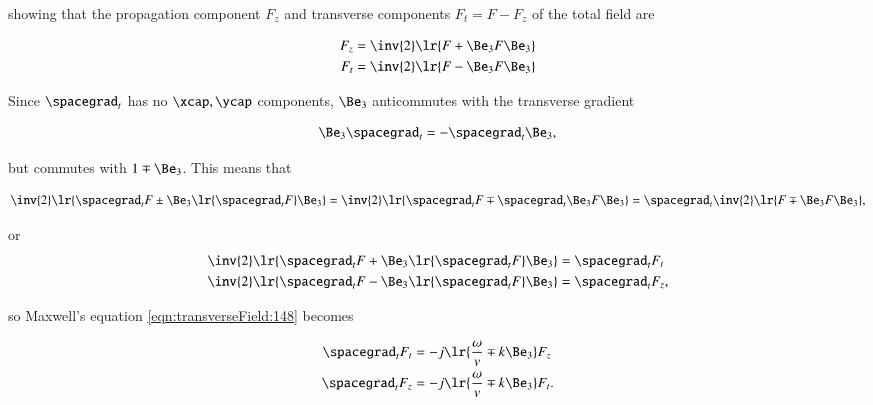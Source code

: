 showing that the propagation component \( F_z \) and transverse components \( F_t = F - F_z \) of the total field are

\begin{dmath}\label{eqn:transverseField:128}
\begin{aligned}
F_z &= \inv{2} \lr{ F + \Be_3 F \Be_3 } \\
F_t &= \inv{2} \lr{ F - \Be_3 F \Be_3 } \\
\end{aligned}
\end{dmath}

Since \( \spacegrad_t \) has no \( \xcap, \ycap \) components, \( \Be_3 \) anticommutes with the transverse gradient

\begin{dmath}\label{eqn:transverseField:168}
\Be_3 \spacegrad_t = - \spacegrad_t \Be_3,
\end{dmath}

but commutes with \( 1 \mp \Be_3 \).
This means that

\begin{dmath}\label{eqn:transverseField:188}
\inv{2} \lr{ \spacegrad_t F \pm \Be_3 \lr{ \spacegrad_t F } \Be_3 }
=
\inv{2} \lr{ \spacegrad_t F \mp \spacegrad_t \Be_3 F \Be_3 }
=
\spacegrad_t
\inv{2} \lr{ F \mp \Be_3 F \Be_3 },
\end{dmath}

or
\begin{dmath}\label{eqn:transverseField:208}
\begin{aligned}
\inv{2} \lr{ \spacegrad_t F + \Be_3 \lr{ \spacegrad_t F } \Be_3 } &= \spacegrad_t F_t \\
\inv{2} \lr{ \spacegrad_t F - \Be_3 \lr{ \spacegrad_t F } \Be_3 } &= \spacegrad_t F_z,
\end{aligned}
\end{dmath}

so Maxwell's equation \cref{eqn:transverseField:148} becomes

\begin{dmath}\label{eqn:transverseField:228}
\begin{aligned}
\spacegrad_t F_t &= - j \lr{ \frac{\omega}{v} \mp k \Be_3 } F_z \\
\spacegrad_t F_z &= - j \lr{ \frac{\omega}{v} \mp k \Be_3 } F_t.
\end{aligned}
\end{dmath}

